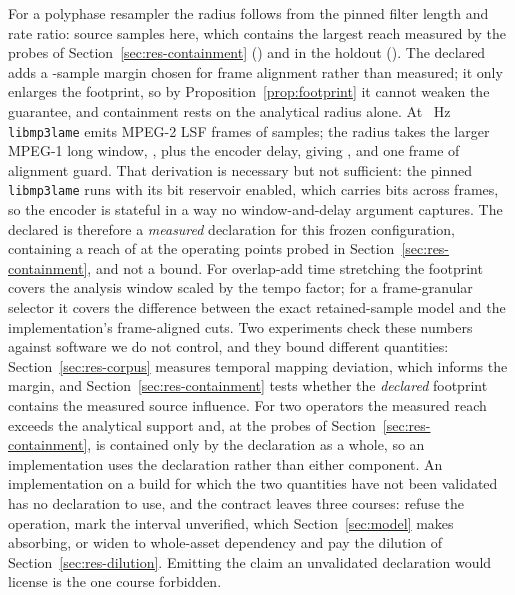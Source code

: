 \documentclass[preprint,3p,11pt,authoryear]{elsarticle}
\begin{document}
For a polyphase resampler the radius
follows from the pinned filter length and rate ratio: \KresampleKernel{} source
samples here, which contains the largest reach measured by the probes of Section~\ref{sec:res-containment}
(\KresampleReach{}) and in the holdout (\KtwoResReach{}). The declared \KresampleFp{}
adds a \KresampleGuard{}-sample margin chosen for frame alignment rather than
measured; it only enlarges
the footprint, so by Proposition~\ref{prop:footprint} it cannot weaken the
guarantee, and containment rests on the analytical radius alone. At \CcorpusFs{}~Hz \texttt{libmp3lame} emits
MPEG-2 LSF frames of \MpThreeGuard{} samples; the radius takes the larger
MPEG-1 long window, \MpThreeWindow{}, plus the encoder delay, giving
\MpThreeKernel{}, and one frame of alignment guard. That derivation is necessary but not sufficient: the pinned
\texttt{libmp3lame} runs with its bit reservoir enabled, which carries bits
across frames, so the encoder is stateful in a way no window-and-delay
argument captures. The declared \MpThreeDeclared{} is therefore a
\emph{measured} declaration for this frozen configuration, containing a reach of
\KmpThreeReach{} at the operating points probed in
Section~\ref{sec:res-containment}, and not a bound. For overlap-add time stretching the footprint covers the analysis window
scaled by the tempo factor; for a frame-granular selector it covers the
difference between the exact retained-sample model and the implementation's
frame-aligned cuts. Two experiments check these numbers against software we do not control, and
they bound different quantities: Section~\ref{sec:res-corpus} measures
temporal mapping deviation, which informs the margin, and
Section~\ref{sec:res-containment} tests whether the \emph{declared}
footprint contains the measured source influence. For two operators the
measured reach exceeds the analytical support and, at the probes of
Section~\ref{sec:res-containment}, is contained only by the declaration as a
whole, so an implementation uses the declaration rather than either component. An implementation on a build for which the two quantities have not been
validated has no
declaration to use, and the contract leaves three courses: refuse the
operation, mark the interval unverified, which Section~\ref{sec:model} makes absorbing, or widen to
whole-asset dependency and pay the dilution of
Section~\ref{sec:res-dilution}. Emitting the claim an unvalidated
declaration would license is the one course forbidden.
\end{document}
